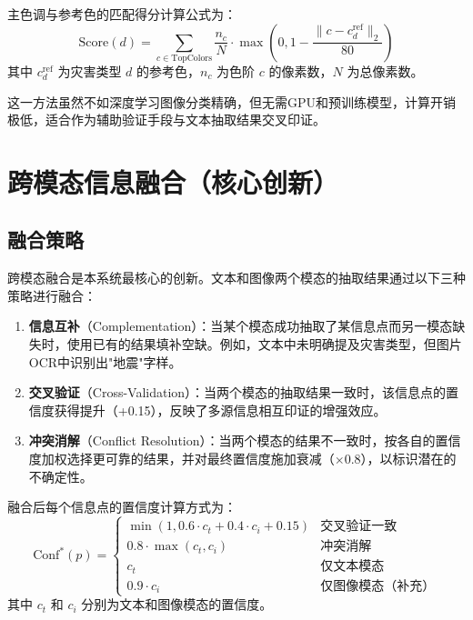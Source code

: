 \documentclass[12pt, a4paper]{ctexart}
\begin{document}
主色调与参考色的匹配得分计算公式为：
\begin{equation}
    \text{Score}(d) = \sum_{c \in \text{TopColors}} \frac{n_c}{N} \cdot \max\left(0, 1 - \frac{\|c - c_d^{\text{ref}}\|_2}{80}\right)
\end{equation}
其中 $c_d^{\text{ref}}$ 为灾害类型 $d$ 的参考色，$n_c$ 为色阶 $c$ 的像素数，$N$ 为总像素数。

这一方法虽然不如深度学习图像分类精确，但无需GPU和预训练模型，计算开销极低，适合作为辅助验证手段与文本抽取结果交叉印证。


\section{跨模态信息融合（核心创新）}

\subsection{融合策略}

跨模态融合是本系统最核心的创新。文本和图像两个模态的抽取结果通过以下三种策略进行融合：

\begin{enumerate}[itemsep=2pt]
    \item \textbf{信息互补}（Complementation）：当某个模态成功抽取了某信息点而另一模态缺失时，使用已有的结果填补空缺。例如，文本中未明确提及灾害类型，但图片OCR中识别出"地震"字样。
    \item \textbf{交叉验证}（Cross-Validation）：当两个模态的抽取结果一致时，该信息点的置信度获得提升（+0.15），反映了多源信息相互印证的增强效应。
    \item \textbf{冲突消解}（Conflict Resolution）：当两个模态的结果不一致时，按各自的置信度加权选择更可靠的结果，并对最终置信度施加衰减（$\times 0.8$），以标识潜在的不确定性。
\end{enumerate}

融合后每个信息点的置信度计算方式为：
\begin{equation}
    \text{Conf}^*(p) = \begin{cases}
    \min(1, 0.6 \cdot c_t + 0.4 \cdot c_i + 0.15) & \text{交叉验证一致} \\
    0.8 \cdot \max(c_t, c_i) & \text{冲突消解} \\
    c_t & \text{仅文本模态} \\
    0.9 \cdot c_i & \text{仅图像模态（补充）}
    \end{cases}
\end{equation}
其中 $c_t$ 和 $c_i$ 分别为文本和图像模态的置信度。
\end{document}
